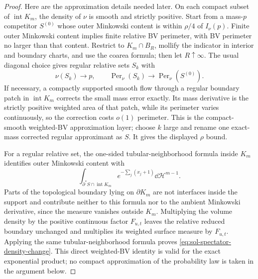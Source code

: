 \documentclass[../main.tex]{subfiles}
\begin{document}
\begin{proof}
Here are the approximation details needed later.  On each compact subset of
$\operatorname{int}K_m$, the density of $\nu$ is smooth and strictly positive.  Start from a
mass-$p$ competitor $S^{(0)}$ whose outer Minkowski content is within $\rho/4$ of $I_\nu(p)$.
Finite outer Minkowski content implies finite relative BV perimeter, with BV perimeter no larger
than that content.  Restrict to $K_m\cap B_R$, mollify the indicator in interior and boundary
charts, and use the coarea formula; then let $R\uparrow\infty$.  The usual diagonal choice gives
regular relative sets $S_k$ with
\[
  \nu(S_k)\longrightarrow p,
  \qquad
  \operatorname{Per}_\nu(S_k)\longrightarrow
  \operatorname{Per}_\nu(S^{(0)}).
\]
If necessary, a compactly supported smooth flow through a regular boundary patch in
$\operatorname{int}K_m$ corrects the small mass error exactly.  Its mass derivative is the
strictly positive weighted area of that patch, while its perimeter varies continuously, so the
correction costs $o(1)$ perimeter.  This is the compact-smooth weighted-BV approximation layer;
choose $k$ large and rename one exact-mass corrected regular approximant as $S$.  It gives the
displayed $\rho$ bound.

For a regular relative set, the one-sided tubular-neighborhood formula inside $K_m$ identifies
outer Minkowski content with
\[
  \int_{\partial^*S\cap\operatorname{int}K_m}
       e^{-\sum_j(x_j+1)}\dd\mathcal H^{m-1}.
\]
Parts of the topological boundary lying on $\partial K_m$ are not interfaces inside the support
and contribute neither to this formula nor to the ambient Minkowski derivative, since the
measure vanishes outside $K_m$.  Multiplying the volume density by the positive continuous
factor $F_{u,t}$ leaves the relative reduced boundary unchanged and multiplies its weighted
surface measure by $F_{u,t}$.  Applying the same tubular-neighborhood formula proves
\eqref{eq:sol-spectator-density-change}.  This direct weighted-BV identity is valid for the
exact exponential product; no compact approximation of the probability law is taken in the
argument below.
\end{proof}
\end{document}
